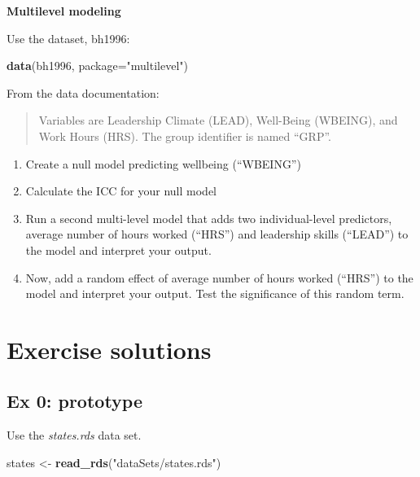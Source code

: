 \documentclass[]{book}
\newenvironment{Shaded}{\begin{snugshade}}{\end{snugshade}}
\newcommand{\KeywordTok}[1]{\textcolor[rgb]{0.13,0.29,0.53}{\textbf{#1}}}
\newcommand{\DataTypeTok}[1]{\textcolor[rgb]{0.13,0.29,0.53}{#1}}
\newcommand{\StringTok}[1]{\textcolor[rgb]{0.31,0.60,0.02}{#1}}
\newcommand{\NormalTok}[1]{#1}
\providecommand{\tightlist}{%
  \setlength{\itemsep}{0pt}\setlength{\parskip}{0pt}}
\begin{document}
\textbf{Multilevel modeling}

Use the dataset, bh1996:

\begin{Shaded}
\begin{Highlighting}[]
\KeywordTok{data}\NormalTok{(bh1996, }\DataTypeTok{package=}\StringTok{"multilevel"}\NormalTok{)}
\end{Highlighting}
\end{Shaded}

From the data documentation:

\begin{quote}
Variables are Leadership Climate (LEAD), Well-Being (WBEING), and Work
Hours (HRS). The group identifier is named ``GRP''.
\end{quote}

\begin{enumerate}
\def\labelenumi{\arabic{enumi}.}
\tightlist
\item
  Create a null model predicting wellbeing (``WBEING'')
\item
  Calculate the ICC for your null model
\item
  Run a second multi-level model that adds two individual-level
  predictors, average number of hours worked (``HRS'') and leadership
  skills (``LEAD'') to the model and interpret your output.
\item
  Now, add a random effect of average number of hours worked (``HRS'')
  to the model and interpret your output. Test the significance of this
  random term.
\end{enumerate}

\section{Exercise solutions}\label{exercise-solutions-1}

\subsection{Ex 0: prototype}\label{ex-0-prototype-1}

Use the \emph{states.rds} data set.

\begin{Shaded}
\begin{Highlighting}[]
\NormalTok{  states <-}\StringTok{ }\KeywordTok{read_rds}\NormalTok{(}\StringTok{"dataSets/states.rds"}\NormalTok{)}
\end{Highlighting}
\end{Shaded}
\end{document}
